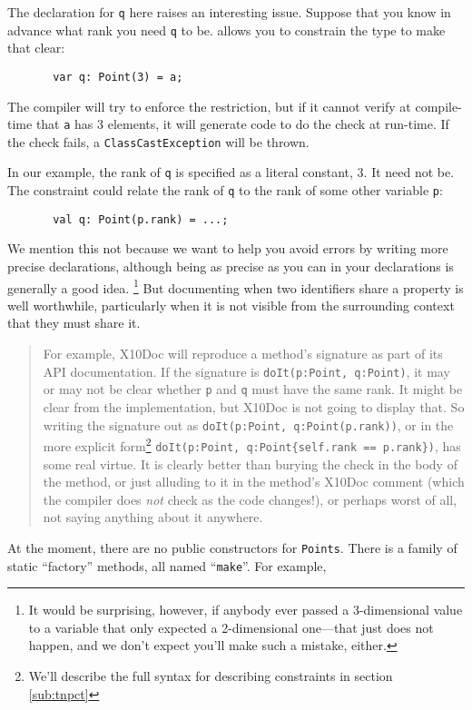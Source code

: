 The declaration for {\tt q} here raises an
interesting issue. Suppose that you know in advance what rank you need {\tt q}
to be. \Xten{} allows you to constrain the type to make that clear:
\begin{verbatim}
       var q: Point(3) = a;
\end{verbatim}
The compiler will try to enforce the restriction, but if it cannot
verify at compile-time that {\tt a} has 3 elements, it will generate code to
do the check at run-time. If the check fails, a {\tt ClassCastException} will be
thrown.

In our example, the rank of {\tt q} is specified as a literal constant, 3.  It
need not be. The constraint could relate the rank of {\tt q} to the rank of
some other variable {\tt p}:
\begin{verbatim}
       val q: Point(p.rank) = ...;
\end{verbatim}
We mention this not because we want to help you avoid errors by writing
more precise declarations, although being as precise as you can in your
declarations is generally a good idea.
\footnote{ It would be surprising, however, if
anybody ever passed a 3-dimensional value to a variable that only expected a
2-dimensional one---that just does not happen, and we don't expect you'll make
such a mistake, either.}  But documenting when two identifiers share a property
is well worthwhile, particularly when it is not visible from the surrounding
context that they must share it.
\begin{quote}
For example, X10Doc will reproduce a method's signature as part of its API
documentation. If the signature is {\tt doIt(p:Point, q:Point)}, it may or may
not be clear whether {\tt p} and {\tt q} must have the same
rank.  It might be clear from the implementation, but X10Doc is not going to
display that.  So writing the signature out as {\tt doIt(p:Point,
q:Point(p.rank))}, or in the more explicit form\footnote{
We'll describe the full syntax for describing constraints in section
\ref{sub:tnpct}}
{\tt doIt(p:Point, q:Point\{self.rank == p.rank\})}, has some real virtue.
It is clearly better than burying the check in the body of the method, or just
alluding to it in the method's X10Doc comment (which the compiler does 
{\em not} check as the code changes!), or perhaps worst of all, not saying 
anything about it anywhere.
\end{quote}
At the moment, there are no public constructors for {\tt Points}.
There is a family of static ``factory'' methods, all named ``{\tt make}''.  For
example,
